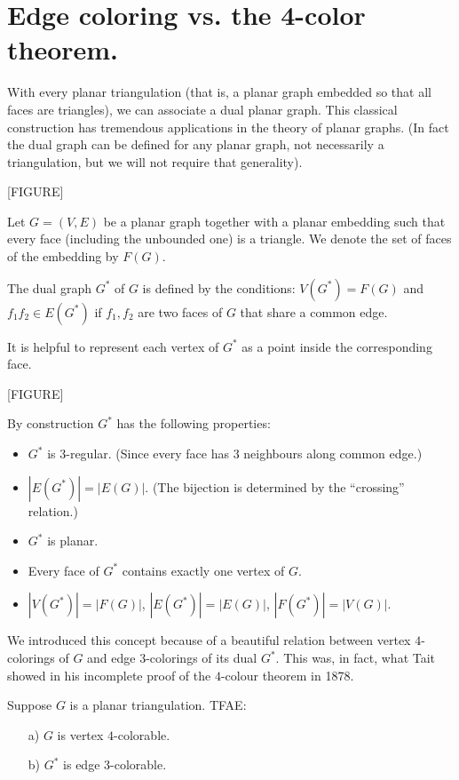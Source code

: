 \section{Edge coloring vs. the 4-color theorem.}

With every planar triangulation (that is, a planar graph embedded so that all faces are triangles), we can associate a dual planar graph. This classical construction has tremendous applications in the theory of planar graphs. (In fact the dual graph can be defined for any planar graph, not necessarily a triangulation, but we will not require that generality).

[FIGURE]

Let $G=(V,E)$ be a planar graph together with a planar embedding such that every face (including the unbounded one) is a triangle. We denote the set of faces of the embedding by $F(G)$.

\begin{definition}
The dual graph $G^*$ of $G$ is defined by the conditions: $V(G^*)=F(G)$ and $f_1f_2\in E(G^*)$ if $f_1,f_2$ are two faces of $G$ that share a common edge. 
\end{definition}

It is helpful to represent each vertex of $G^*$ as a point inside the corresponding face.

[FIGURE]

\begin{observation}
By construction $G^*$ has the following properties:
\begin{itemize}
    \item $G^*$ is 3-regular. (Since every face has 3 neighbours along common edge.)
    \item $|E(G^*)|=|E(G)|.$ (The bijection is determined by the ``crossing'' relation.)
    \item $G^*$ is planar.
    \item Every face of $G^*$ contains exactly one vertex of $G$.
    \item $|V(G^*)|=|F(G)|$, $|E(G^*)|=|E(G)|$,  $|F(G^*)|=|V(G)|$.
\end{itemize}
\end{observation}

We introduced this concept because of a beautiful relation between vertex $4$-colorings of $G$ and edge $3$-colorings of its dual $G^*$. This was, in fact, what Tait showed in his incomplete proof of the $4$-colour theorem in 1878. 

\begin{theorem}[Tait 1878]
Suppose $G$ is a planar triangulation. TFAE:
\begin{enumerate}
    \item[a)] $G$ is vertex $4$-colorable.
    \item[b)] $G^*$ is edge $3$-colorable.
\end{enumerate}
\end{theorem}

